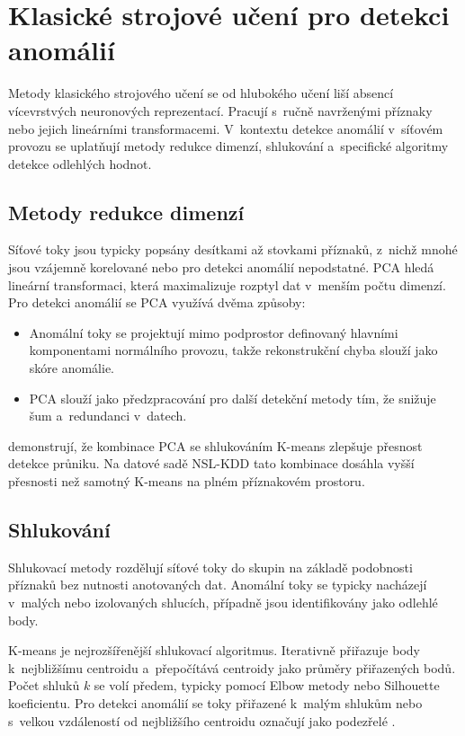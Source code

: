 \section{Klasické strojové učení pro detekci anomálií}
\label{sec:klasicke-ml}

Metody klasického strojového učení se od hlubokého učení liší absencí vícevrstvých neuronových reprezentací. Pracují s~ručně navrženými příznaky nebo jejich lineárními transformacemi. V~kontextu detekce anomálií v~síťovém provozu se uplatňují metody redukce dimenzí, shlukování a~specifické algoritmy detekce odlehlých hodnot.

\subsection{Metody redukce dimenzí}
\label{sec:pca}

Síťové toky jsou typicky popsány desítkami až stovkami příznaků, z~nichž mnohé jsou vzájemně korelované nebo pro detekci anomálií nepodstatné. PCA hledá lineární transformaci, která maximalizuje rozptyl dat v~menším počtu dimenzí. Pro detekci anomálií se PCA využívá dvěma způsoby:
\begin{itemize}
\item Anomální toky se projektují mimo podprostor definovaný hlavními komponentami normálního provozu, takže rekonstrukční chyba slouží jako skóre anomálie.
\item PCA slouží jako předzpracování pro další detekční metody tím, že snižuje šum a~redundanci v~datech.
\end{itemize}
\noindent \textcite{Chapagain2022} demonstrují, že kombinace PCA se shlukováním K-means zlepšuje přesnost detekce průniku. Na datové sadě NSL-KDD tato kombinace dosáhla vyšší přesnosti než samotný K-means na plném příznakovém prostoru.

\subsection{Shlukování}
\label{sec:shlukovani}

Shlukovací metody rozdělují síťové toky do skupin na základě podobnosti příznaků bez nutnosti anotovaných dat. Anomální toky se typicky nacházejí v~malých nebo izolovaných shlucích, případně jsou identifikovány jako odlehlé body.

K-means je nejrozšířenější shlukovací algoritmus. Iterativně přiřazuje body k~nejbližšímu centroidu a~přepočítává centroidy jako průměry přiřazených bodů. Počet shluků $k$ se volí předem, typicky pomocí Elbow metody nebo Silhouette koeficientu. Pro detekci anomálií se toky přiřazené k~malým shlukům nebo s~velkou vzdáleností od nejbližšího centroidu označují jako podezřelé \parencite{Chapagain2022}.

